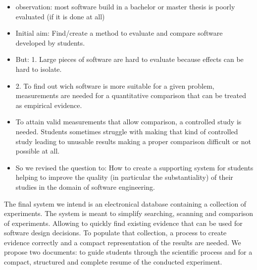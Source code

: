 \begin{itemize}
\item observation: most software build in a bachelor or master thesis is poorly evaluated (if it is done at all)
\item Initial aim: Find/create a method to evaluate and compare software developed by students.
\item But: 1. Large pieces of software are hard to evaluate because effects can be hard to isolate.
\item 2.  To find out wich software is more suitable for a given problem, measurements are needed for a quantitative comparison that can be treated as empirical evidence.
\item To attain valid measurements that allow comparison, a controlled study is needed.
Students sometimes struggle with making that kind of controlled study  leading to unusable results making a proper comparison difficult or not possible at all.
\item So we revised the question to:
How to create a supporting system for students helping to improve the quality (in particular the substantiality) of their studies in the domain of software engineering.

\end{itemize}

The final system we intend is an electronical database containing a collection of experiments. The system is meant to simplify searching, scanning and comparison of experiments. Allowing to quickly find existing evidence that can be used for software design decisions. To populate that collection, a process to create evidence correctly and a compact representation of the results are needed. We propose two documents: \emph{\checklist} to guide students through the scientific process and \emph{\briefingform} for a compact, structured and complete resume of the conducted experiment. 



